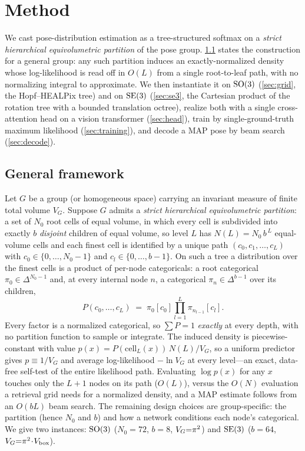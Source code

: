 \section{Method}
\label{sec:method}

We cast pose-distribution estimation as a tree-structured softmax on a
\emph{strict hierarchical equivolumetric partition} of the pose group.
\cref{sec:framework} states the construction for a general group: any such
partition induces an exactly-normalized density whose log-likelihood is read off
in $O(L)$ from a single root-to-leaf path, with no normalizing integral to
approximate. We then instantiate it on $\mathrm{SO}(3)$
(\cref{sec:grid}, the Hopf--HEALPix tree) and on $\mathrm{SE}(3)$ (\cref{sec:se3}, the
Cartesian product of the rotation tree with a bounded translation octree), realize
both with a single cross-attention head on a vision transformer
(\cref{sec:head}), train by single-ground-truth maximum likelihood
(\cref{sec:training}), and decode a MAP pose by beam search (\cref{sec:decode}).

\subsection{General framework}
\label{sec:framework}

Let $G$ be a group (or homogeneous space) carrying an invariant measure of finite
total volume $V_G$. Suppose $G$ admits a \emph{strict hierarchical equivolumetric
partition}: a set of $N_0$ root cells of equal volume, in which every cell is
subdivided into exactly $b$ \emph{disjoint} children of equal volume, so level $L$
has $N(L)=N_0\,b^{\,L}$ equal-volume cells and each finest cell is identified by a
unique path $(c_0,c_1,\dots,c_L)$ with $c_0\in\{0,\dots,N_0{-}1\}$ and
$c_l\in\{0,\dots,b{-}1\}$. On such a tree a distribution over the finest cells is a
product of per-node categoricals: a root categorical $\pi_0\in\Delta^{N_0-1}$ and,
at every internal node $n$, a categorical $\pi_n\in\Delta^{b-1}$ over its children,
\begin{equation}
  P(c_0,\dots,c_L) \;=\; \pi_0[c_0]\prod_{l=1}^{L}\pi_{n_{l-1}}[c_l].
\end{equation}
Every factor is a normalized categorical, so $\sum P = 1$ \emph{exactly} at every
depth, with no partition function to sample or integrate. The induced density is
piecewise-constant with value $p(x)=P(\mathrm{cell}_L(x))\,N(L)/V_G$, so a uniform
predictor gives $p\equiv 1/V_G$ and average log-likelihood $-\ln V_G$ at every
level---an exact, data-free self-test of the entire likelihood path. Evaluating
$\log p(x)$ for any $x$ touches only the $L{+}1$ nodes on its path ($O(L)$), versus
the $O(N)$ evaluation a retrieval grid needs for a normalized density, and a MAP
estimate follows from an $O(bL)$ beam search. The remaining design choices are
group-specific: the partition (hence $N_0$ and $b$) and how a network conditions
each node's categorical. We give two instances: $\mathrm{SO}(3)$ ($N_0{=}72$, $b{=}8$,
$V_G{=}\pi^2$) and $\mathrm{SE}(3)$ ($b{=}64$, $V_G{=}\pi^2\!\cdot\!V_{\text{box}}$).

